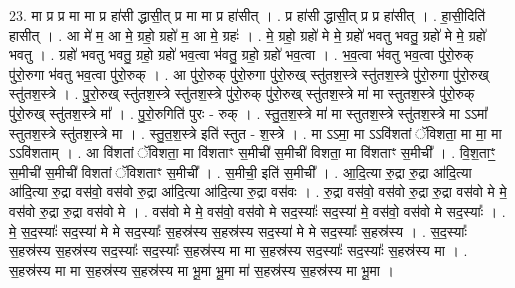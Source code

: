 \documentclass[17pt]{extarticle}
\begin{document}
23. मा प्र प्र मा मा प्र हा॑सी द्धासी॒त् प्र मा मा प्र हा॑सीत् । . प्र हा॑सी द्धासी॒त् प्र प्र हा॑सीत् । . हा॒सी॒दिति॑ हासीत् । . आ मे॑ म॒ आ मे॒ ग्रहो॒ ग्रहो॑ म॒ आ मे॒ ग्रहः॑ । . मे॒ ग्रहो॒ ग्रहो॑ मे मे॒ ग्रहो॑ भवतु भवतु॒ ग्रहो॑ मे मे॒ ग्रहो॑ भवतु । . ग्रहो॑ भवतु भवतु॒ ग्रहो॒ ग्रहो॑ भव॒त्वा भ॑वतु॒ ग्रहो॒ ग्रहो॑ भव॒त्वा । . भ॒व॒त्वा भ॑वतु भव॒त्वा पु॑रो॒रुक् पु॑रो॒रुगा भ॑वतु भव॒त्वा पु॑रो॒रुक् । . आ पु॑रो॒रुक् पु॑रो॒रुगा पु॑रो॒रुख् स्तु॑तश॒स्त्रे स्तु॑तश॒स्त्रे पु॑रो॒रुगा पु॑रो॒रुख् स्तु॑तश॒स्त्रे । . पु॒रो॒रुख् स्तु॑तश॒स्त्रे स्तु॑तश॒स्त्रे पु॑रो॒रुक् पु॑रो॒रुख् स्तु॑तश॒स्त्रे मा॑ मा स्तुतश॒स्त्रे पु॑रो॒रुक् पु॑रो॒रुख् स्तु॑तश॒स्त्रे मा᳚ । . पु॒रो॒रुगिति॑ पुरः - रुक् । . स्तु॒त॒श॒स्त्रे मा॑ मा स्तुतश॒स्त्रे स्तु॑तश॒स्त्रे मा ऽऽमा᳚ स्तुतश॒स्त्रे स्तु॑तश॒स्त्रे मा । . स्तु॒त॒श॒स्त्रे इति॑ स्तुत - श॒स्त्रे । . मा ऽऽमा॒ मा ऽऽवि॑शतां ॅविशता॒ मा मा॒ मा ऽऽवि॑शताम् । . आ वि॑शतां ॅविशता॒ मा वि॑शताꣳ स॒मीची॑ स॒मीची॑ विशता॒ मा वि॑शताꣳ स॒मीची᳚ । . वि॒श॒ताꣳ॒॒ स॒मीची॑ स॒मीची॑ विशतां ॅविशताꣳ स॒मीची᳚ । . स॒मीची॒ इति॑ स॒मीची᳚ । . आ॒दि॒त्या रु॒द्रा रु॒द्रा आ॑दि॒त्या आ॑दि॒त्या रु॒द्रा वस॑वो॒ वस॑वो रु॒द्रा आ॑दि॒त्या आ॑दि॒त्या रु॒द्रा वस॑वः । . रु॒द्रा वस॑वो॒ वस॑वो रु॒द्रा रु॒द्रा वस॑वो मे मे॒ वस॑वो रु॒द्रा रु॒द्रा वस॑वो मे । . वस॑वो मे मे॒ वस॑वो॒ वस॑वो मे सद॒स्याः᳚ सद॒स्या॑ मे॒ वस॑वो॒ वस॑वो मे सद॒स्याः᳚ । . मे॒ स॒द॒स्याः᳚ सद॒स्या॑ मे मे सद॒स्याः᳚ स॒हस्र॑स्य स॒हस्र॑स्य सद॒स्या॑ मे मे सद॒स्याः᳚ स॒हस्र॑स्य । . स॒द॒स्याः᳚ स॒हस्र॑स्य स॒हस्र॑स्य सद॒स्याः᳚ सद॒स्याः᳚ स॒हस्र॑स्य मा मा स॒हस्र॑स्य सद॒स्याः᳚ सद॒स्याः᳚ स॒हस्र॑स्य मा । . स॒हस्र॑स्य मा मा स॒हस्र॑स्य स॒हस्र॑स्य मा भू॒मा भू॒मा मा॑ स॒हस्र॑स्य स॒हस्र॑स्य मा भू॒मा । \newline
\end{document}
